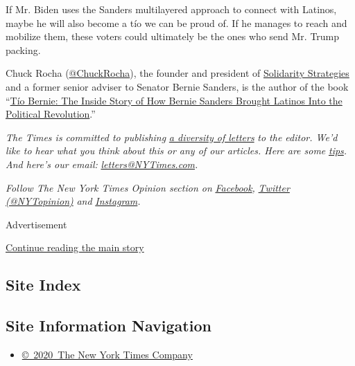 If Mr. Biden uses the Sanders multilayered approach to connect with
Latinos, maybe he will also become a tío we can be proud of. If he
manages to reach and mobilize them, these voters could ultimately be the
ones who send Mr. Trump packing.

Chuck Rocha
(\href{https://twitter.com/ChuckRocha?ref_src=twsrc\%5Egoogle\%7Ctwcamp\%5Eserp\%7Ctwgr\%5Eauthor}{@ChuckRocha}),
the founder and president of
\href{https://www.solidaritystrategies.com/}{Solidarity Strategies} and
a former senior adviser to Senator Bernie Sanders, is the author of the
book ``\href{https://strongarmpress.com/catalog/tio-bernie/}{Tío Bernie:
The Inside Story of How Bernie Sanders Brought Latinos Into the
Political Revolution}.''

\emph{The Times is committed to publishing}
\href{https://www.nytimes3xbfgragh.onion/2019/01/31/opinion/letters/letters-to-editor-new-york-times-women.html}{\emph{a
diversity of letters}} \emph{to the editor. We'd like to hear what you
think about this or any of our articles. Here are some}
\href{https://help.nytimes3xbfgragh.onion/hc/en-us/articles/115014925288-How-to-submit-a-letter-to-the-editor}{\emph{tips}}\emph{.
And here's our email:}
\href{mailto:letters@NYTimes.com}{\emph{letters@NYTimes.com}}\emph{.}

\emph{Follow The New York Times Opinion section on}
\href{https://www.facebookcorewwwi.onion/nytopinion}{\emph{Facebook}}\emph{,}
\href{http://twitter.com/NYTOpinion}{\emph{Twitter (@NYTopinion)}}
\emph{and}
\href{https://www.instagram.com/nytopinion/}{\emph{Instagram}}\emph{.}

Advertisement

\protect\hyperlink{after-bottom}{Continue reading the main story}

\hypertarget{site-index}{%
\subsection{Site Index}\label{site-index}}

\hypertarget{site-information-navigation}{%
\subsection{Site Information
Navigation}\label{site-information-navigation}}

\begin{itemize}
\tightlist
\item
  \href{https://help.nytimes3xbfgragh.onion/hc/en-us/articles/115014792127-Copyright-notice}{©~2020~The
  New York Times Company}
\end{itemize}


